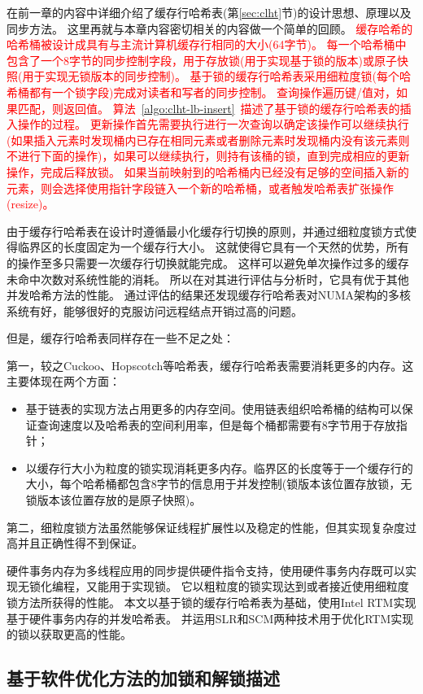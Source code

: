 在前一章的内容中详细介绍了缓存行哈希表(第\ref{sec:clht}节)的设计思想、原理以及同步方法。
这里再就与本章内容密切相关的内容做一个简单的回顾。
\textcolor{red}{缓存哈希的哈希桶被设计成具有与主流计算机缓存行相同的大小(64字节)。
每一个哈希桶中包含了一个8字节的同步控制字段，用于存放锁(用于实现基于锁的版本)或原子快照(用于实现无锁版本的同步控制)。
基于锁的缓存行哈希表采用细粒度锁(每个哈希桶都有一个锁字段)完成对读者和写者的同步控制。
查询操作遍历键/值对，如果匹配，则返回值。
算法~\ref{algo:clht-lb-insert}~描述了基于锁的缓存行哈希表的插入操作的过程。
更新操作首先需要执行进行一次查询以确定该操作可以继续执行(如果插入元素时发现桶内已存在相同元素或者删除元素时发现桶内没有该元素则不进行下面的操作)，如果可以继续执行，则持有该桶的锁，直到完成相应的更新操作，完成后释放锁。
如果当前映射到的哈希桶内已经没有足够的空间插入新的元素，则会选择使用指针字段链入一个新的哈希桶，或者触发哈希表扩张操作(resize)。
}

由于缓存行哈希表在设计时遵循最小化缓存行切换的原则，并通过细粒度锁方式使得临界区的长度固定为一个缓存行大小。
这就使得它具有一个天然的优势，所有的操作至多只需要一次缓存行切换就能完成。
这样可以避免单次操作过多的缓存未命中次数对系统性能的消耗。
所以在对其进行评估与分析时，它具有优于其他并发哈希方法的性能。
通过评估的结果还发现缓存行哈希表对NUMA架构的多核系统有好，能够很好的克服访问远程结点开销过高的问题。

但是，缓存行哈希表同样存在一些不足之处：

第一，较之Cuckoo、Hopscotch等哈希表，缓存行哈希表需要消耗更多的内存。这主要体现在两个方面：
\begin{itemize}
\item 基于链表的实现方法占用更多的内存空间。使用链表组织哈希桶的结构可以保证查询速度以及哈希表的空间利用率，但是每个桶都需要有8字节用于存放指针；
\item 以缓存行大小为粒度的锁实现消耗更多内存。临界区的长度等于一个缓存行的大小，每个哈希桶都包含8字节的信息用于并发控制(锁版本该位置存放锁，无锁版本该位置存放的是原子快照)。
\end{itemize}

第二，细粒度锁方法虽然能够保证线程扩展性以及稳定的性能，但其实现复杂度过高并且正确性得不到保证。

硬件事务内存为多线程应用的同步提供硬件指令支持，使用硬件事务内存既可以实现无锁化编程，又能用于实现锁。
它以粗粒度的锁实现达到或者接近使用细粒度锁方法所获得的性能。
本文以基于锁的缓存行哈希表为基础，使用Intel RTM实现基于硬件事务内存的并发哈希表。
并运用SLR和SCM两种技术用于优化RTM实现的锁以获取更高的性能。

\subsection{基于软件优化方法的加锁和解锁描述}

